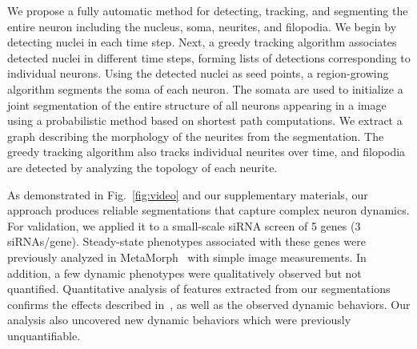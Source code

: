  
We  propose a  fully  automatic method  for  detecting, tracking,  and
segmenting the  entire neuron  including the nucleus,  soma, neurites,
and filopodia. We begin by  detecting nuclei in each time step.  Next,
a greedy  tracking algorithm  associates detected nuclei  in different
time steps,  forming lists  of detections corresponding  to individual
neurons.  Using  the detected nuclei as seed  points, a region-growing
algorithm segments the soma of  each neuron.  The somata are used to
initialize a joint segmentation of the entire structure of all neurons
appearing in  a image using  a probabilistic method based  on shortest
path computations.   We extract a  graph describing the  morphology of
the  neurites from  the segmentation.   The greedy  tracking algorithm
also tracks individual neurites  over time, and filopodia are detected
by analyzing the topology of each neurite.







As   demonstrated  in   Fig.~\ref{fig:video}  and   our  supplementary
materials, our  approach produces reliable  segmentations that capture
complex  neuron  dynamics.   For   validation,  we  applied  it  to  a
small-scale  siRNA screen  of 5  genes (3  siRNAs/gene).  Steady-state
phenotypes  associated with  these genes  were previously  analyzed in
MetaMorph\texttrademark~\cite{Pertz08} with simple image measurements.
In addition, a few  dynamic phenotypes were qualitatively observed but
not quantified.  Quantitative analysis  of features extracted from our
segmentations  confirms the  effects  described in~\cite{Pertz08},  as
well as  the observed dynamic behaviors.  Our  analysis also uncovered
new dynamic behaviors which were previously unquantifiable.


